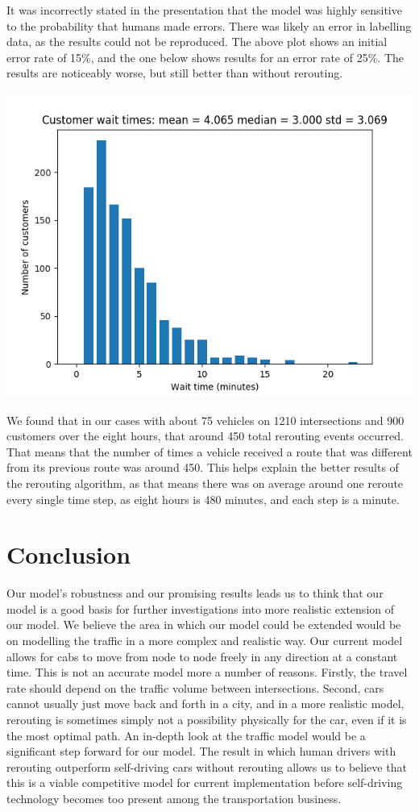\documentclass[Proceedings]{ascelike}
\begin{document}
It was incorrectly stated in the presentation that the model was highly sensitive to the probability that humans
made errors. There was likely an error in labelling data, as the results could not be reproduced. The above plot
shows an initial error rate of 15\%, and the one below shows results for an error rate of 25\%. The results are
noticeably worse, but still better than without rerouting.

\includegraphics[width=0.75 \textwidth]{human_high_error_customers}

We found that in our cases with about 75 vehicles on 1210 intersections and 900 customers over the eight hours, that
around 450 total rerouting events occurred. That means that the number of times a vehicle received a route that was
different from its previous route was around 450. This helps explain the better results of the rerouting algorithm, as
that means there was on average around one reroute every single time step, as eight hours is 480 minutes, and each
step is a minute.

\section*{Conclusion}

Our model's robustness and our promising results leads us to think that our model is a good basis for further investigations into more realistic extension of our model. We believe the area in which our model could be extended would be on modelling the traffic in a more complex and realistic way. Our current model allows for cabs to move from node to node freely in any direction at a constant time. This is not an accurate model more a number of reasons. Firstly, the travel rate should depend on the traffic volume between intersections. Second, cars cannot usually just move back and forth in a city, and in a more realistic model, rerouting is sometimes simply not a possibility physically for the car, even if it is the most optimal path. An in-depth look at the traffic model would be a significant step forward for our model. The result in which human drivers with rerouting outperform self-driving cars without rerouting allows us to believe that this is a viable competitive model for current implementation before self-driving technology becomes too present among the transportation business.   
\end{document}
